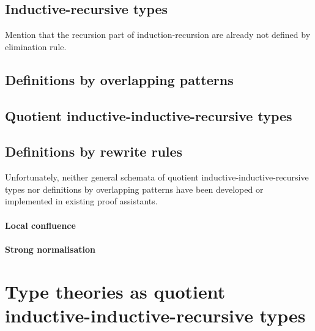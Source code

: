 \documentclass[a4paper,UKenglish,numberwithinsect,cleveref,thm-restate]{lipics-v2021}
\begin{document}
\subsection{Inductive-recursive types}
\cite{Dybjer2003,Dybjer2000,Dybjer1999}

Mention that the recursion part of induction-recursion are already not defined by elimination rule.

\subsection{Definitions by overlapping patterns}
\cite{Cockx2014,Altenkirch2016a}
\subsection{Quotient inductive-inductive-recursive types}
\subsection{Definitions by rewrite rules}
\cite{Cockx2020,Cockx2021}

Unfortunately, neither general schemata of quotient inductive-inductive-recursive types nor definitions by overlapping patterns have been developed or implemented in existing proof assistants.

\paragraph*{Local confluence}
\paragraph*{Strong normalisation}


\section{Type theories as quotient inductive-inductive-recursive types} \label{sec:QIIRTs}
\end{document}
